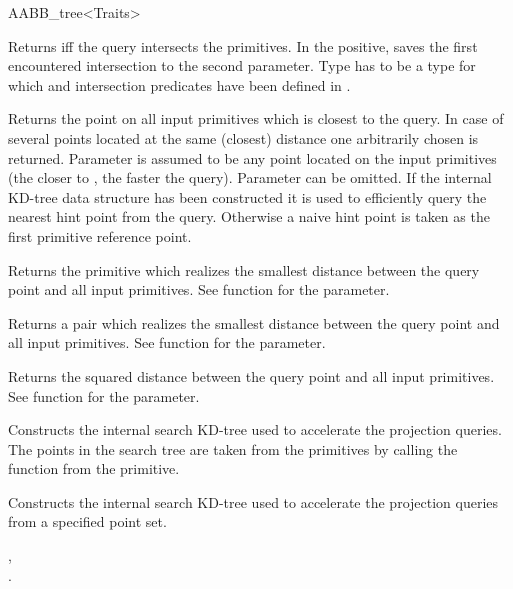 \begin{ccRefClass}{AABB_tree<Traits>}


{Returns  iff the query intersects the primitives. In the positive, saves the first encountered intersection to the second parameter. Type  has to be a type for which  and intersection predicates have been defined in .}



{Returns the point on all input primitives which is closest to the query. In case of several points located at the same (closest) distance one arbitrarily chosen is returned.  Parameter  is assumed to be any point located on the input primitives (the closer  to , the faster the query). Parameter  can be omitted. If the internal KD-tree data structure has been constructed it is used to efficiently query the nearest hint point from the query. Otherwise a naive hint point is taken as the first primitive reference point. }

{Returns the primitive which realizes the smallest distance between the query point and all input primitives. See  function for the  parameter. }

{Returns a pair  which realizes the smallest distance between the query point and all input primitives. See  function for the  parameter. }

{Returns the squared distance between the query point and all input primitives. See  function for the  parameter. }


{ Constructs the internal search KD-tree used to accelerate the projection queries. The points in the search tree are taken from the primitives by calling the function  from the primitive.}

{ Constructs the internal search KD-tree used to accelerate the projection queries from a specified point set. }

\ccSeeAlso

, \\
.

\end{ccRefClass}

\ccRefPageEnd

